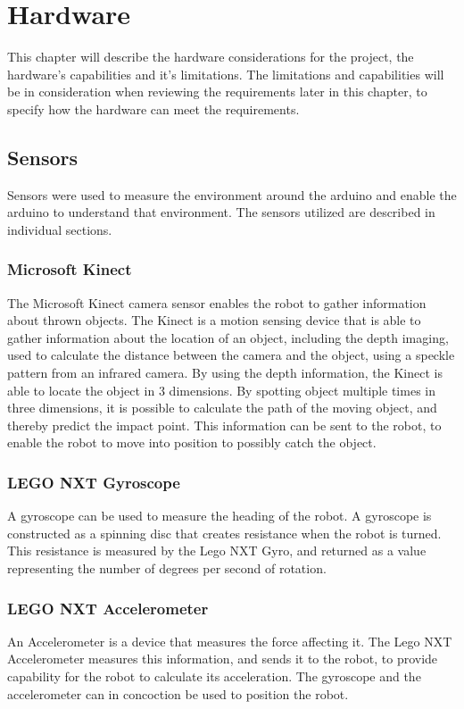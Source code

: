 \chapter{Hardware}
\label{chap:Hardware} 
This chapter will describe the hardware considerations for the project, the hardware’s capabilities and it’s limitations. The limitations and capabilities will be in consideration when reviewing the requirements later in this chapter, to specify how the hardware can meet the requirements.

\section{Sensors}
\label{sec:Sensors}
Sensors were used to measure the environment around the arduino and enable the arduino to understand that environment. The sensors utilized are described in individual sections. 

\subsection{Microsoft Kinect}
\label{sec:Microsoft Kinect}
The Microsoft Kinect camera sensor enables the robot to gather information about thrown objects. The Kinect is a motion sensing device that is able to gather information about the location of an object, including the depth imaging, used to calculate the distance between the camera and the object, using a speckle pattern from an infrared camera. By using the depth information, the Kinect is able to locate the object in 3 dimensions.
By spotting object multiple times in three dimensions, it is possible to calculate the path of the moving object, and thereby predict the impact point. This information can be sent to the robot, to enable the robot to move into position to possibly catch the object.

\subsection{LEGO NXT Gyroscope}
\label{sec:LEGO NXT Gyroscope}
A gyroscope can be used to measure the heading of the robot. A gyroscope is constructed as a spinning disc that creates resistance when the robot is turned. This resistance is measured by the Lego NXT Gyro, and returned as a value representing the number of degrees per second of rotation. 

\subsection{LEGO NXT Accelerometer}
\label{sec:LEGO NXT Accelerometer}
An Accelerometer is a device that measures the force affecting it. The Lego NXT Accelerometer measures this information, and sends it to the robot, to provide capability for the robot to calculate its acceleration. The gyroscope and the accelerometer can in concoction be used to position the robot.

